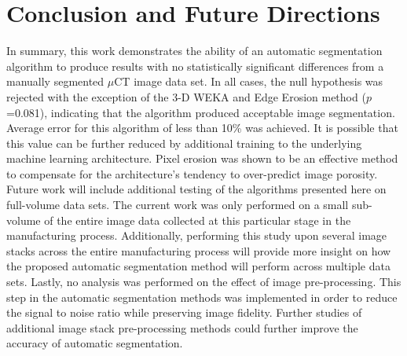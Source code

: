 \documentclass[11pt, twocolumn]{IEEEtran}
\begin{document}
\section{Conclusion and Future Directions} 

In summary, this work demonstrates the ability of an automatic segmentation algorithm to produce results with no statistically significant differences from a manually segmented $\mu$CT image data set. In all cases, the null hypothesis was rejected with the exception of the 3-D WEKA and Edge Erosion method ($p$=0.081), indicating that the algorithm produced acceptable image segmentation. Average error for this algorithm of less than 10\% was achieved. It is possible that this value can be further reduced by additional training to the underlying machine learning architecture. Pixel erosion was shown to be an effective method to compensate for the architecture's tendency to over-predict image porosity.\\
Future work will include additional testing of the algorithms presented here on full-volume data sets. The current work was only performed on a small sub-volume of the entire image data collected at this particular stage in the manufacturing process. Additionally, performing this study upon several image stacks across the entire manufacturing process will provide more insight on how the proposed automatic segmentation method will perform across multiple data sets. Lastly, no analysis was performed on the effect of image pre-processing. This step in the automatic segmentation methods was implemented in order to reduce the signal to noise ratio while preserving image fidelity. Further studies of additional image stack pre-processing methods could further improve the accuracy of automatic segmentation.

%

\end{document}
